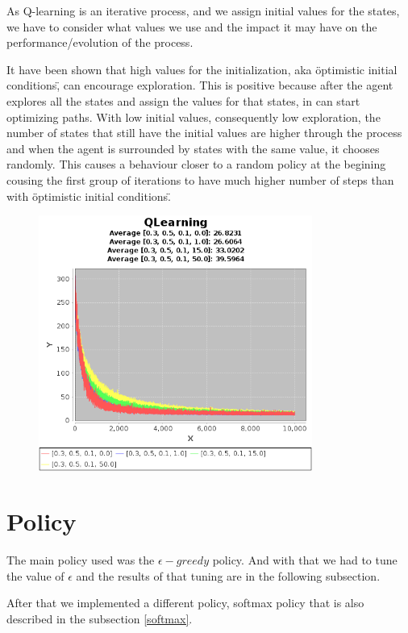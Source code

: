 \documentclass{article}
\begin{document}
As Q-learning is an iterative process, and we assign initial values for the
states, we have to consider what values we use and the impact it may have on the
performance/evolution of the process.

It have been shown that high values for the initialization, aka \"optimistic
initial conditions\", can encourage exploration. This is positive because after
the agent explores all the states and assign the values for that states, in can
start optimizing paths.
With low initial values, consequently low exploration, the number of states that
still have the initial values are higher through the process and when the agent
is surrounded by states with the same value, it chooses randomly. This causes a
behaviour closer to a random policy at the begining cousing the first group of
iterations to have much higher number of steps than with \"optimistic
initial conditions\".

\begin{figure}[h]
\centering
\includegraphics[width=0.8\textwidth]{res/alpha_03_gama_05_epsilon_01IV_00_to_50.png}
\end{figure}

\section{Policy}
The main policy used was the $\epsilon-greedy$ policy. And with that we had to
tune the value of $\epsilon$ and the results of that tuning are in the following
subsection.

After that we implemented a different policy, softmax policy that is also
described in the subsection \ref{softmax}.
\end{document}
